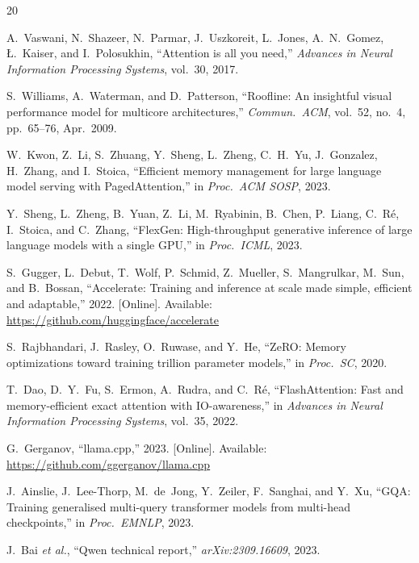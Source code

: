 \documentclass[lettersize,journal]{IEEEtran}
\begin{document}
{\sloppy
\begin{thebibliography}{20}


A.~Vaswani, N.~Shazeer, N.~Parmar, J.~Uszkoreit, L.~Jones, A.~N.~Gomez,
{\L}.~Kaiser, and I.~Polosukhin,
``Attention is all you need,''
\textit{Advances in Neural Information Processing Systems}, vol.~30, 2017.

S.~Williams, A.~Waterman, and D.~Patterson,
``Roofline: An insightful visual performance model for multicore architectures,''
\textit{Commun.\ ACM}, vol.~52, no.~4, pp.~65--76, Apr.~2009.

W.~Kwon, Z.~Li, S.~Zhuang, Y.~Sheng, L.~Zheng, C.~H.~Yu, J.~Gonzalez,
H.~Zhang, and I.~Stoica,
``Efficient memory management for large language model serving with PagedAttention,''
in \textit{Proc.\ ACM SOSP}, 2023.

Y.~Sheng, L.~Zheng, B.~Yuan, Z.~Li, M.~Ryabinin, B.~Chen, P.~Liang,
C.~R{\'e}, I.~Stoica, and C.~Zhang,
``FlexGen: High-throughput generative inference of large language models with a single GPU,''
in \textit{Proc.\ ICML}, 2023.

S.~Gugger, L.~Debut, T.~Wolf, P.~Schmid, Z.~Mueller, S.~Mangrulkar,
M.~Sun, and B.~Bossan,
``Accelerate: Training and inference at scale made simple, efficient and adaptable,''
2022. [Online]. Available: \url{https://github.com/huggingface/accelerate}

S.~Rajbhandari, J.~Rasley, O.~Ruwase, and Y.~He,
``ZeRO: Memory optimizations toward training trillion parameter models,''
in \textit{Proc.\ SC}, 2020.

T.~Dao, D.~Y.~Fu, S.~Ermon, A.~Rudra, and C.~R{\'e},
``FlashAttention: Fast and memory-efficient exact attention with IO-awareness,''
in \textit{Advances in Neural Information Processing Systems}, vol.~35, 2022.

G.~Gerganov,
``llama.cpp,'' 2023. [Online]. Available: \url{https://github.com/ggerganov/llama.cpp}

J.~Ainslie, J.~Lee-Thorp, M.~de~Jong, Y.~Zeiler, F.~Sanghai, and Y.~Xu,
``GQA: Training generalised multi-query transformer models from multi-head checkpoints,''
in \textit{Proc.\ EMNLP}, 2023.

J.~Bai \textit{et al.},
``Qwen technical report,''
\textit{arXiv:2309.16609}, 2023.


\end{thebibliography}}
\end{document}
